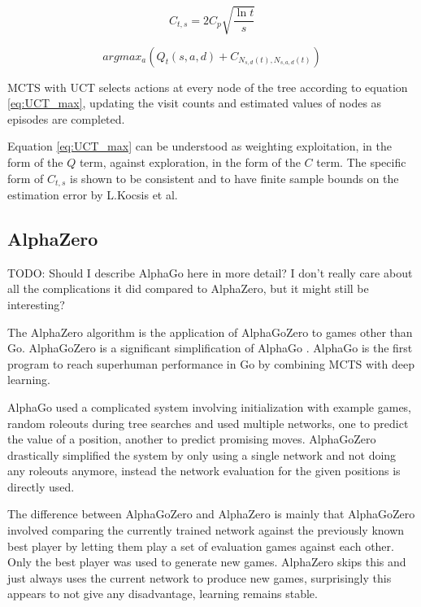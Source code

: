 \documentclass[12pt,onecolumn,oneside,titlepage]{article}
\begin{document}
\begin{equation}
 C_{t,s} = 2C_p \sqrt{\frac{\ln t}{s}}\label{eq:UCT_bias}
\end{equation}


\begin{equation}
 argmax_a(Q_t(s,a,d) + C_{N_{s,d}(t), N_{s,a,d}(t)}\label{eq:UCT_max})
\end{equation}

MCTS with UCT selects actions at every node of the tree according to equation \ref{eq:UCT_max}, updating the visit counts and estimated values of nodes as episodes are completed.

Equation \ref{eq:UCT_max} can be understood as weighting exploitation, in the form of the $Q$ term, against exploration, in the form of the $C$ term. The specific form of $C_{t,s}$ is shown to be consistent and to have finite sample bounds on the estimation error by L.Kocsis et al.


\subsection{AlphaZero}

TODO: Should I describe AlphaGo here in more detail? I don't really care about all the complications it did compared to AlphaZero, but it might still be interesting?

The AlphaZero algorithm \cite{silver2018general} is the application of AlphaGoZero \cite{silver2017mastering} to games other than Go. AlphaGoZero is a significant simplification of AlphaGo \cite{silver2016mastering}.
AlphaGo  is the first program to reach superhuman performance in Go by combining MCTS with deep learning.

AlphaGo used a complicated system involving initialization with example games, random roleouts during tree searches and used multiple networks, one to predict the value of a position, another to predict promising moves.
AlphaGoZero drastically simplified the system by only using a single network and not doing any roleouts anymore, instead the network evaluation for the given positions is directly used.

The difference between AlphaGoZero and AlphaZero is mainly that AlphaGoZero involved comparing the currently trained network against the previously known best player by letting them play a set of evaluation games against each other.
Only the best player was used to generate new games. AlphaZero skips this and just always uses the current network to produce new games, surprisingly this appears to not give any disadvantage, learning remains stable.
\end{document}

